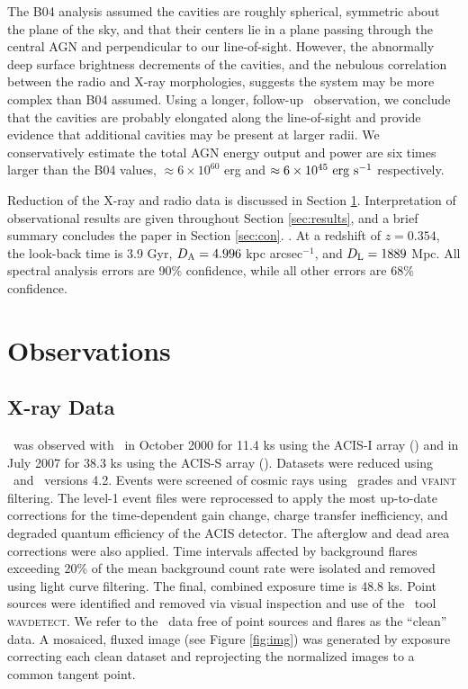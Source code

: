 \documentclass[iop]{emulateapj}
\begin{document}
The B04 analysis assumed the cavities are roughly spherical, symmetric
about the plane of the sky, and that their centers lie in a plane
passing through the central AGN and perpendicular to our
line-of-sight. However, the abnormally deep surface brightness
decrements of the cavities, and the nebulous correlation between the
radio and X-ray morphologies, suggests the system may be more complex
than B04 assumed. Using a longer, follow-up \cxo\ observation, we
conclude that the cavities are probably elongated along the
line-of-sight and provide evidence that additional cavities may be
present at larger radii. We conservatively estimate the total AGN
energy output and power are six times larger than the B04 values,
$\approx 6 \times 10^{60}$ erg and $\approx 6 \times 10^{45} ~\rm{\mbox{\ensuremath{\rm{erg}}}~\ensuremath{\rm{\mbox{\ensuremath{\rm{s}}}^{-1}}}}$
respectively.

Reduction of the X-ray and radio data is discussed in Section
\ref{sec:obs}. Interpretation of observational results are given
throughout Section \ref{sec:results}, and a brief summary concludes
the paper in Section \ref{sec:con}. \LCDM. At a redshift of $z =
0.354$, the look-back time is 3.9 Gyr, $D_{\rm{A}} = 4.996$ kpc
arcsec$^{-1}$, and $D_{\rm{L}} = 1889$ Mpc. All spectral analysis errors are
90\% confidence, while all other errors are 68\% confidence.

\section{Observations}
\label{sec:obs}

\subsection{X-ray Data}
\label{sec:xray}

\rbs\ was observed with \cxo\ in October 2000 for 11.4 ks using the
ACIS-I array () and in
July 2007 for 38.3 ks using the ACIS-S array (). Datasets were reduced using
\ciao\ and \caldb\ versions 4.2. Events were screened of cosmic rays
using \asca\ grades and {\textsc{vfaint}} filtering. The level-1 event
files were reprocessed to apply the most up-to-date corrections for
the time-dependent gain change, charge transfer inefficiency, and
degraded quantum efficiency of the ACIS detector. The afterglow and
dead area corrections were also applied. Time intervals affected by
background flares exceeding 20\% of the mean background count rate
were isolated and removed using light curve filtering. The final,
combined exposure time is 48.8 ks. Point sources were identified and
removed via visual inspection and use of the \ciao\ tool
{\textsc{wavdetect}}. We refer to the \cxo\ data free of point sources
and flares as the ``clean'' data. A mosaiced, fluxed image (see Figure
\ref{fig:img}) was generated by exposure correcting each clean dataset
and reprojecting the normalized images to a common tangent point.
\end{document}
